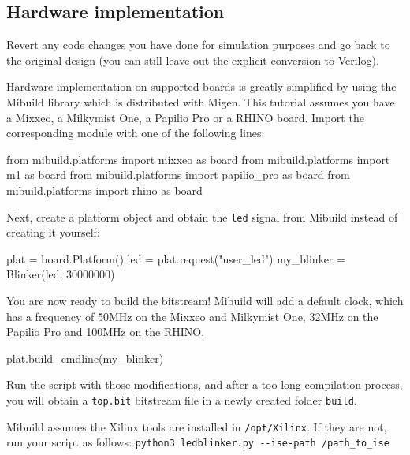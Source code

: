 \documentclass[11pt]{paper}
\begin{document}

\subsection{Hardware implementation}
Revert any code changes you have done for simulation purposes and go back to the original design (you can still leave out the explicit conversion to Verilog).

Hardware implementation on supported boards is greatly simplified by using the Mibuild library which is distributed with Migen. This tutorial assumes you have a Mixxeo, a Milkymist One, a Papilio Pro or a RHINO board. Import the corresponding module with one of the following lines:

\begin{verbatimtab}
from mibuild.platforms import mixxeo as board
from mibuild.platforms import m1 as board
from mibuild.platforms import papilio_pro as board
from mibuild.platforms import rhino as board
\end{verbatimtab}


Next, create a platform object and obtain the \verb!led! signal from Mibuild instead of creating it yourself:
\begin{verbatimtab}
plat = board.Platform()
led = plat.request("user_led")
my_blinker = Blinker(led, 30000000)
\end{verbatimtab}

You are now ready to build the bitstream! Mibuild will add a default clock, which has a frequency of 50MHz on the Mixxeo and Milkymist One, 32MHz on the Papilio Pro and 100MHz on the RHINO.
\begin{verbatimtab}
plat.build_cmdline(my_blinker)
\end{verbatimtab}

Run the script with those modifications, and after a too long compilation process, you will obtain a \verb!top.bit! bitstream file in a newly created folder \verb!build!.

Mibuild assumes the Xilinx tools are installed in \verb!/opt/Xilinx!. If they are not, run your script as follows: \verb!python3 ledblinker.py --ise-path /path_to_ise!
\end{document}
